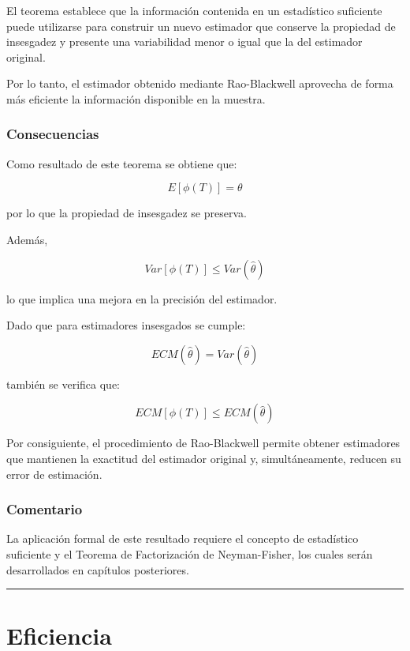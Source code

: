 \documentclass[
  11pt,
]{report}
\begin{document}
El teorema establece que la información contenida en un estadístico
suficiente puede utilizarse para construir un nuevo estimador que
conserve la propiedad de insesgadez y presente una variabilidad menor o
igual que la del estimador original.

Por lo tanto, el estimador obtenido mediante Rao-Blackwell aprovecha de
forma más eficiente la información disponible en la muestra.

\subsubsection{Consecuencias}\label{consecuencias}

Como resultado de este teorema se obtiene que:

\[E[\phi(T)]
=
\theta\]

por lo que la propiedad de insesgadez se preserva.

Además,

\[Var[\phi(T)]
\le
Var(\hat{\theta})\]

lo que implica una mejora en la precisión del estimador.

Dado que para estimadores insesgados se cumple:

\[ECM(\hat{\theta})
=
Var(\hat{\theta})\]

también se verifica que:

\[ECM[\phi(T)]
\le
ECM(\hat{\theta})\]

Por consiguiente, el procedimiento de Rao-Blackwell permite obtener
estimadores que mantienen la exactitud del estimador original y,
simultáneamente, reducen su error de estimación.

\subsubsection{Comentario}\label{comentario}

La aplicación formal de este resultado requiere el concepto de
estadístico suficiente y el Teorema de Factorización de Neyman-Fisher,
los cuales serán desarrollados en capítulos posteriores.

\begin{center}\rule{0.5\linewidth}{0.5pt}\end{center}

\section{Eficiencia}\label{eficiencia}
\end{document}
